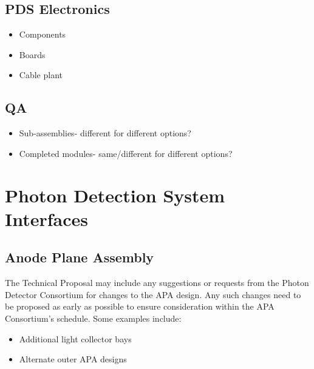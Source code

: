 \subsection{PDS Electronics}
\label{sec:fdsp-pd-assy-pde}


\begin{itemize}
\item Components
\item Boards
\item Cable plant
\end{itemize}

\subsection{QA}
\label{sec:fdsp-pd-assy-qa}


\begin{itemize}
\item Sub-assemblies- different for different options?
\item Completed modules- same/different for different options?
\end{itemize}



\section{Photon Detection System Interfaces}
\label{sec:fdsp-pd-intfc}



\subsection{Anode Plane Assembly}
\label{sec:fdsp-pd-intfc-apa}

The Technical Proposal may include any suggestions or requests from the Photon Detector Consortium
for changes to the APA design. Any such changes need to be proposed as early as possible to ensure
consideration within the APA Consortium's schedule. Some examples include:
\begin{itemize}
\item Additional light collector bays
\item Alternate outer APA designs
\end{itemize}

